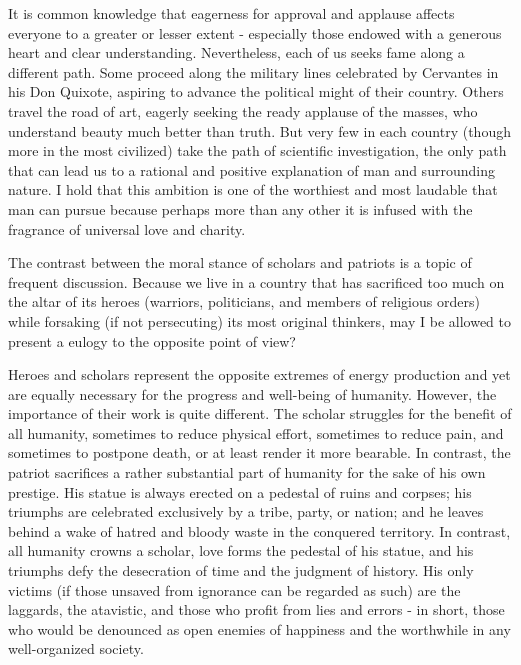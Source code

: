 \documentclass{article}
\begin{document}
It is common knowledge that eagerness for approval and applause affects everyone to a greater or lesser extent - especially those endowed with a generous heart and clear understanding. Nevertheless, each of us seeks fame along a different path. Some proceed along the military lines celebrated by Cervantes in his Don Quixote, aspiring to advance the political might of their country. Others travel the road of art, eagerly seeking the ready applause of the masses, who understand beauty much better than truth. But very few in each country (though more in the most civilized) take the path of scientific investigation, the only path that can lead us to a rational and positive explanation of man and surrounding nature. I hold that this ambition is one of the worthiest and most laudable that man can pursue because perhaps more than any other it is infused with the fragrance of universal love and charity.

The contrast between the moral stance of scholars and patriots is a topic of frequent discussion. Because we live in a country that has sacrificed too much on the altar of its heroes (warriors, politicians, and members of religious orders) while forsaking (if not persecuting) its most original thinkers, may I be allowed to present a eulogy to the opposite point of view?

Heroes and scholars represent the opposite extremes of energy production and yet are equally necessary for the progress and well-being of humanity. However, the importance of their work is quite different. The scholar struggles for the benefit of all humanity, sometimes to reduce physical effort, sometimes to reduce pain, and sometimes to postpone death, or at least render it more bearable. In contrast, the patriot sacrifices a rather substantial part of humanity for the sake of his own prestige. His statue is always erected on a pedestal of ruins and corpses; his triumphs are celebrated exclusively by a tribe, party, or nation; and he leaves behind a wake of hatred and bloody waste in the conquered territory. In contrast, all humanity crowns a scholar, love forms the pedestal of his statue, and his triumphs defy the desecration of time and the judgment of history. His only victims (if those unsaved from ignorance can be regarded as such) are the laggards, the atavistic, and those who profit from lies and errors - in short, those who would be denounced as open enemies of happiness and the worthwhile in any well-organized society.
\end{document}
